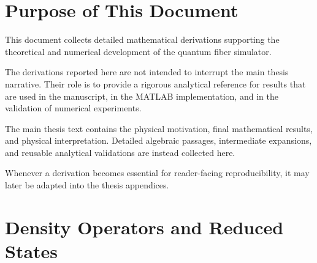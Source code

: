 \documentclass[a4paper,12pt]{report}
\begin{document}
\maketitle


\chapter{Purpose of This Document}

This document collects detailed mathematical derivations supporting the theoretical and numerical development of the quantum fiber simulator.

The derivations reported here are not intended to interrupt the main thesis narrative. Their role is to provide a rigorous analytical reference for results that are used in the manuscript, in the MATLAB implementation, and in the validation of numerical experiments.

\medskip

The main thesis text contains the physical motivation, final mathematical results, and physical interpretation. Detailed algebraic passages, intermediate expansions, and reusable analytical validations are instead collected here.

\medskip

Whenever a derivation becomes essential for reader-facing reproducibility, it may later be adapted into the thesis appendices.

\tableofcontents


\chapter{Density Operators and Reduced States}





\end{document}
